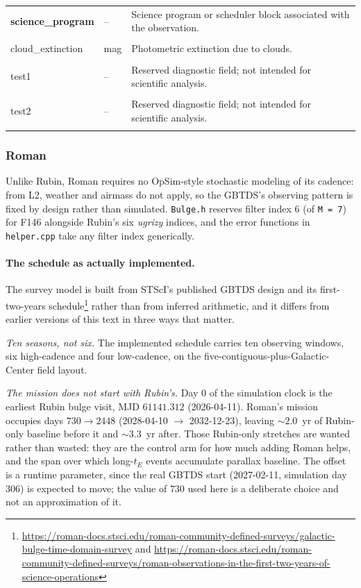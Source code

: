 \documentclass[english,10pt,a4paper]{article}
\begin{document}
\begin{longtable}{p{3.8cm}p{2cm}p{8.2cm}}
		\textbf{science\_program} & -- &
		Science program or scheduler block associated with the observation. \\&&\\
		
		cloud\_extinction & mag &
		Photometric extinction due to clouds. \\&&\\
		
		test1 & -- &
		Reserved diagnostic field; not intended for scientific analysis. \\&&\\
		
		test2 & -- &
		Reserved diagnostic field; not intended for scientific analysis. \\&&\\
		
		\bottomrule
	\end{longtable}
	
	\subsubsection{Roman}
	
	Unlike Rubin, Roman requires no OpSim-style stochastic modeling of its cadence: from L2, weather and airmass do not apply, so the GBTDS's observing pattern is fixed by design rather than simulated. \texttt{Bulge.h} reserves filter index 6 (of \texttt{M = 7}) for F146 alongside Rubin's six \textit{ugrizy} indices, and the error functions in \texttt{helper.cpp} take any filter index generically.

	\paragraph{The schedule as actually implemented.} The survey model is built from STScI's published GBTDS design and its first-two-years schedule\footnote{\url{https://roman-docs.stsci.edu/roman-community-defined-surveys/galactic-bulge-time-domain-survey} and \url{https://roman-docs.stsci.edu/roman-community-defined-surveys/roman-observations-in-the-first-two-years-of-science-operations}} rather than from inferred arithmetic, and it differs from earlier versions of this text in three ways that matter.

	\emph{Ten seasons, not six.} The implemented schedule carries ten observing windows, six high-cadence and four low-cadence, on the five-contiguous-plus-Galactic-Center field layout.

	\emph{The mission does not start with Rubin's.} Day $0$ of the simulation clock is the earliest Rubin bulge visit, MJD $61141.312$ (2026-04-11). Roman's mission occupies days $730\rightarrow2448$ (2028-04-10 $\rightarrow$ 2032-12-23), leaving $\sim2.0$~yr of Rubin-only baseline before it and $\sim3.3$~yr after. Those Rubin-only stretches are wanted rather than wasted: they are the control arm for how much adding Roman helps, and the span over which long-$t_E$ events accumulate parallax baseline. The offset is a runtime parameter, since the real GBTDS start (2027-02-11, simulation day $306$) is expected to move; the value of $730$ used here is a deliberate choice and not an approximation of it.
\end{document}
